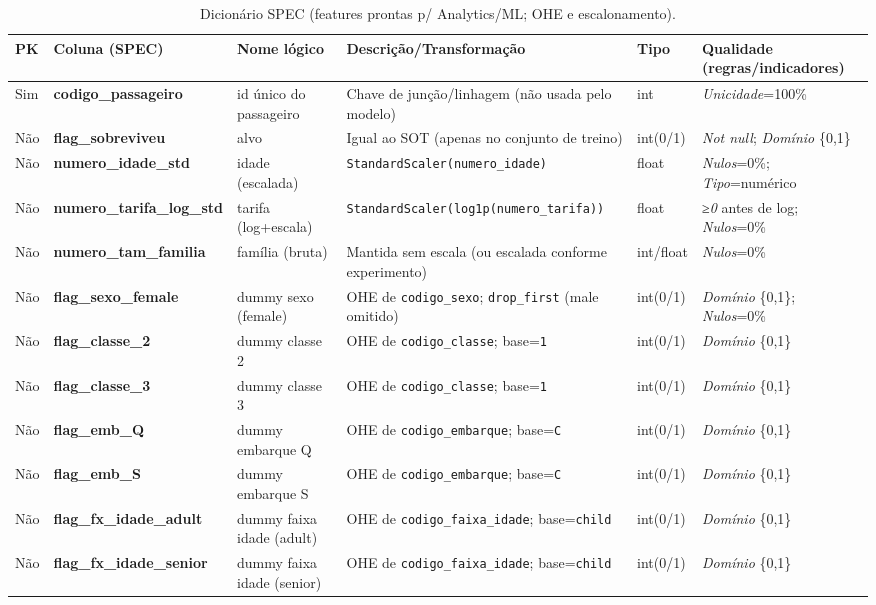 \documentclass[12pt,a4paper]{article}
\begin{document}
\begin{table}[h!]
\centering
\footnotesize
\begin{tabular}{@{}llp{3.4cm}p{6.4cm}lp{5.8cm}@{}}
\toprule
\textbf{PK} & \textbf{Coluna (SPEC)} & \textbf{Nome lógico} & \textbf{Descrição/Transformação} & \textbf{Tipo} & \textbf{Qualidade (regras/indicadores)} \\
\midrule
Sim  & \textbf{codigo\_passageiro} & id único do passageiro &
Chave de junção/linhagem (não usada pelo modelo) & int &
\textit{Unicidade}=100\% \\
Não  & \textbf{flag\_sobreviveu}   & alvo &
Igual ao SOT (apenas no conjunto de treino) & int(0/1) &
\textit{Not null}; \textit{Domínio} \{0,1\} \\
Não  & \textbf{numero\_idade\_std} & idade (escalada) &
\texttt{StandardScaler(numero\_idade)} & float &
\textit{Nulos}=0\%; \textit{Tipo}=numérico \\
Não  & \textbf{numero\_tarifa\_log\_std} & tarifa (log+escala) &
\texttt{StandardScaler(log1p(numero\_tarifa))} & float &
\textit{≥0} antes de log; \textit{Nulos}=0\% \\
Não  & \textbf{numero\_tam\_familia} & família (bruta) &
Mantida sem escala (ou escalada conforme experimento) & int/float &
\textit{Nulos}=0\% \\
Não  & \textbf{flag\_sexo\_female} & dummy sexo (female) &
OHE de \texttt{codigo\_sexo}; \texttt{drop\_first} (male omitido) & int(0/1) &
\textit{Domínio} \{0,1\}; \textit{Nulos}=0\% \\
Não  & \textbf{flag\_classe\_2} & dummy classe 2 &
OHE de \texttt{codigo\_classe}; base=\texttt{1} & int(0/1) &
\textit{Domínio} \{0,1\} \\
Não  & \textbf{flag\_classe\_3} & dummy classe 3 &
OHE de \texttt{codigo\_classe}; base=\texttt{1} & int(0/1) &
\textit{Domínio} \{0,1\} \\
Não  & \textbf{flag\_emb\_Q} & dummy embarque Q &
OHE de \texttt{codigo\_embarque}; base=\texttt{C} & int(0/1) &
\textit{Domínio} \{0,1\} \\
Não  & \textbf{flag\_emb\_S} & dummy embarque S &
OHE de \texttt{codigo\_embarque}; base=\texttt{C} & int(0/1) &
\textit{Domínio} \{0,1\} \\
Não  & \textbf{flag\_fx\_idade\_adult} & dummy faixa idade (adult) &
OHE de \texttt{codigo\_faixa\_idade}; base=\texttt{child} & int(0/1) &
\textit{Domínio} \{0,1\} \\
Não  & \textbf{flag\_fx\_idade\_senior} & dummy faixa idade (senior) &
OHE de \texttt{codigo\_faixa\_idade}; base=\texttt{child} & int(0/1) &
\textit{Domínio} \{0,1\} \\
\bottomrule
\end{tabular}
\caption{Dicionário SPEC (features prontas p/ Analytics/ML; OHE e escalonamento).}
\end{table}
\end{document}
